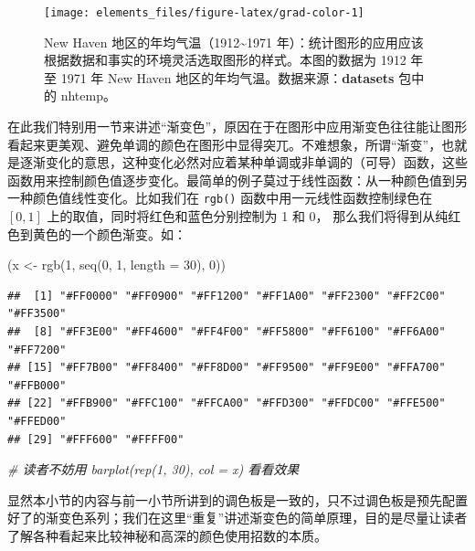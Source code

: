 \documentclass[
  b5paper,
  UTF8,twoside]{book}
\newenvironment{Shaded}{\begin{snugshade}}{\end{snugshade}}
\newcommand{\AttributeTok}[1]{\textcolor[rgb]{0.77,0.63,0.00}{#1}}
\newcommand{\CommentTok}[1]{\textcolor[rgb]{0.56,0.35,0.01}{\textit{#1}}}
\newcommand{\DecValTok}[1]{\textcolor[rgb]{0.00,0.00,0.81}{#1}}
\newcommand{\FunctionTok}[1]{\textcolor[rgb]{0.00,0.00,0.00}{#1}}
\newcommand{\NormalTok}[1]{#1}
\newcommand{\OtherTok}[1]{\textcolor[rgb]{0.56,0.35,0.01}{#1}}
\begin{document}
\begin{figure}

{\centering \texttt{[image: elements\_files/figure-latex/grad-color-1]} 

}

\caption[New Haven 地区的年均气温（1912~1971 年）]{New Haven 地区的年均气温（1912\textasciitilde1971 年）：统计图形的应用应该根据数据和事实的环境灵活选取图形的样式。本图的数据为 1912 年至 1971 年 New Haven 地区的年均气温。数据来源：\textbf{datasets} 包中的 nhtemp。}\label{fig:grad-color}
\end{figure}



在此我们特别用一节来讲述``渐变色''，原因在于在图形中应用渐变色往往能让图形看起来更美观、避免单调的颜色在图形中显得突兀。不难想象，所谓``渐变''，也就是逐渐变化的意思，这种变化必然对应着某种单调或非单调的（可导）函数，这些函数用来控制颜色值逐步变化。最简单的例子莫过于线性函数：从一种颜色值到另一种颜色值线性变化。比如我们在 \texttt{rgb()} 函数中用一元线性函数控制绿色在 \([0, 1]\) 上的取值，同时将红色和蓝色分别控制为 1 和 0， 那么我们将得到从纯红色到黄色的一个颜色渐变。如：

\begin{Shaded}
\begin{Highlighting}[]
\NormalTok{(x }\OtherTok{\textless{}{-}} \FunctionTok{rgb}\NormalTok{(}\DecValTok{1}\NormalTok{, }\FunctionTok{seq}\NormalTok{(}\DecValTok{0}\NormalTok{, }\DecValTok{1}\NormalTok{, }\AttributeTok{length =} \DecValTok{30}\NormalTok{), }\DecValTok{0}\NormalTok{))}
\end{Highlighting}
\end{Shaded}

\begin{verbatim}
##  [1] "#FF0000" "#FF0900" "#FF1200" "#FF1A00" "#FF2300" "#FF2C00" "#FF3500"
##  [8] "#FF3E00" "#FF4600" "#FF4F00" "#FF5800" "#FF6100" "#FF6A00" "#FF7200"
## [15] "#FF7B00" "#FF8400" "#FF8D00" "#FF9500" "#FF9E00" "#FFA700" "#FFB000"
## [22] "#FFB900" "#FFC100" "#FFCA00" "#FFD300" "#FFDC00" "#FFE500" "#FFED00"
## [29] "#FFF600" "#FFFF00"
\end{verbatim}

\begin{Shaded}
\begin{Highlighting}[]
\CommentTok{\# 读者不妨用 barplot(rep(1, 30), col = x) 看看效果}
\end{Highlighting}
\end{Shaded}

显然本小节的内容与前一小节所讲到的调色板是一致的，只不过调色板是预先配置好了的渐变色系列；我们在这里``重复''讲述渐变色的简单原理，目的是尽量让读者了解各种看起来比较神秘和高深的颜色使用招数的本质。
\end{document}
